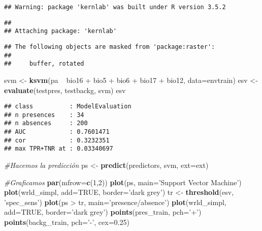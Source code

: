 \documentclass[]{article}
\newenvironment{Shaded}{\begin{snugshade}}{\end{snugshade}}
\newcommand{\KeywordTok}[1]{\textcolor[rgb]{0.13,0.29,0.53}{\textbf{{#1}}}}
\newcommand{\DataTypeTok}[1]{\textcolor[rgb]{0.13,0.29,0.53}{{#1}}}
\newcommand{\DecValTok}[1]{\textcolor[rgb]{0.00,0.00,0.81}{{#1}}}
\newcommand{\FloatTok}[1]{\textcolor[rgb]{0.00,0.00,0.81}{{#1}}}
\newcommand{\StringTok}[1]{\textcolor[rgb]{0.31,0.60,0.02}{{#1}}}
\newcommand{\CommentTok}[1]{\textcolor[rgb]{0.56,0.35,0.01}{\textit{{#1}}}}
\newcommand{\OtherTok}[1]{\textcolor[rgb]{0.56,0.35,0.01}{{#1}}}
\newcommand{\NormalTok}[1]{{#1}}
\begin{document}
\begin{verbatim}
## Warning: package 'kernlab' was built under R version 3.5.2
\end{verbatim}

\begin{verbatim}
## 
## Attaching package: 'kernlab'
\end{verbatim}

\begin{verbatim}
## The following objects are masked from 'package:raster':
## 
##     buffer, rotated
\end{verbatim}

\begin{Shaded}
\begin{Highlighting}[]
\NormalTok{svm <-}\StringTok{ }\KeywordTok{ksvm}\NormalTok{(pa ~}\StringTok{ }\NormalTok{bio16 +}\StringTok{ }\NormalTok{bio5 +}\StringTok{ }\NormalTok{bio6 +}\StringTok{ }\NormalTok{bio17 +}\StringTok{ }\NormalTok{bio12, }\DataTypeTok{data=}\NormalTok{envtrain)}
\NormalTok{esv <-}\StringTok{ }\KeywordTok{evaluate}\NormalTok{(testpres, testbackg, svm)}
\NormalTok{esv}
\end{Highlighting}
\end{Shaded}

\begin{verbatim}
## class          : ModelEvaluation 
## n presences    : 34 
## n absences     : 200 
## AUC            : 0.7601471 
## cor            : 0.3232351 
## max TPR+TNR at : 0.03340697
\end{verbatim}

\begin{Shaded}
\begin{Highlighting}[]
\CommentTok{#Hacemos la predicción}
\NormalTok{ps <-}\StringTok{ }\KeywordTok{predict}\NormalTok{(predictors, svm, }\DataTypeTok{ext=}\NormalTok{ext)}

\CommentTok{#Graficamos}
\KeywordTok{par}\NormalTok{(}\DataTypeTok{mfrow=}\KeywordTok{c}\NormalTok{(}\DecValTok{1}\NormalTok{,}\DecValTok{2}\NormalTok{))}
\KeywordTok{plot}\NormalTok{(ps, }\DataTypeTok{main=}\StringTok{'Support Vector Machine'}\NormalTok{)}
\KeywordTok{plot}\NormalTok{(wrld_simpl, }\DataTypeTok{add=}\OtherTok{TRUE}\NormalTok{, }\DataTypeTok{border=}\StringTok{'dark grey'}\NormalTok{)}
\NormalTok{tr <-}\StringTok{ }\KeywordTok{threshold}\NormalTok{(esv, }\StringTok{'spec_sens'}\NormalTok{)}
\KeywordTok{plot}\NormalTok{(ps >}\StringTok{ }\NormalTok{tr, }\DataTypeTok{main=}\StringTok{'presence/absence'}\NormalTok{)}
\KeywordTok{plot}\NormalTok{(wrld_simpl, }\DataTypeTok{add=}\OtherTok{TRUE}\NormalTok{, }\DataTypeTok{border=}\StringTok{'dark grey'}\NormalTok{)}
\KeywordTok{points}\NormalTok{(pres_train, }\DataTypeTok{pch=}\StringTok{'+'}\NormalTok{)}
\KeywordTok{points}\NormalTok{(backg_train, }\DataTypeTok{pch=}\StringTok{'-'}\NormalTok{, }\DataTypeTok{cex=}\FloatTok{0.25}\NormalTok{)}
\end{Highlighting}
\end{Shaded}
\end{document}
